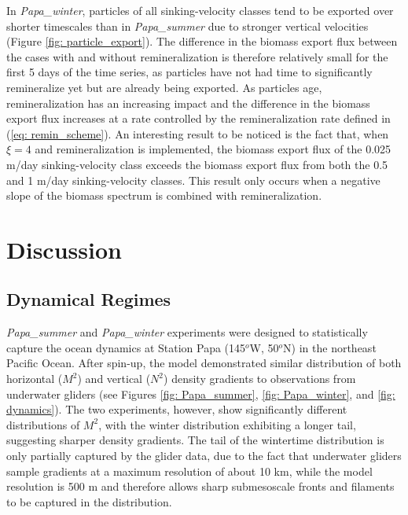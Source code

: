 \documentclass[draft,linenumbers]{agujournal2018}
\begin{document}
 In \textit{Papa\_winter}, particles of all sinking-velocity classes tend to be exported over shorter timescales than in \textit{Papa\_summer} due to stronger vertical velocities (Figure \ref{fig: particle_export}). The difference in the biomass export flux between the cases with and without remineralization is therefore relatively small for the first 5 days of the time series, as particles have not had time to significantly remineralize yet but are already being exported. As particles age, remineralization has an increasing impact and the difference in the biomass export flux increases at a rate controlled by the remineralization rate defined in (\ref{eq: remin_scheme}). An interesting result to be noticed is the fact that, when $\xi = 4$ and remineralization is implemented, the biomass export flux of the 0.025 m/day sinking-velocity class exceeds the biomass export flux from both the 0.5 and 1 m/day sinking-velocity classes. This result only occurs when a negative slope of the biomass spectrum is combined with remineralization.

\section{Discussion}
\label{sec: Discussion}

\subsection{Dynamical Regimes}
\label{sec: Discussion_model}
\textit{Papa\_summer} and \textit{Papa\_winter} experiments were designed to statistically capture the ocean dynamics at Station Papa (145$^o$W, 50$^o$N) in the northeast Pacific Ocean. After spin-up, the model demonstrated similar distribution of both horizontal ($M^2$) and vertical ($N^2$) density gradients to observations from underwater gliders (see Figures \ref{fig: Papa_summer}, \ref{fig: Papa_winter}, and \ref{fig: dynamics}). The two experiments, however, show significantly different distributions of $M^2$, with the winter distribution exhibiting a longer tail, suggesting sharper density gradients. The tail of the wintertime distribution is only partially captured by the glider data, due to the fact that underwater gliders sample gradients at a maximum resolution of about 10 km, while the model resolution is 500 m and therefore allows sharp submesoscale fronts and filaments to be captured in the distribution.
\end{document}
